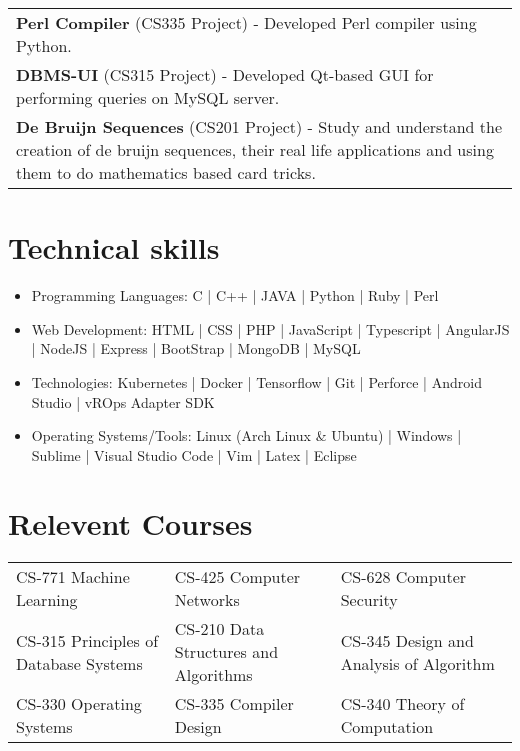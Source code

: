 \documentclass{article}
\begin{document}
\begin{tabularx}{\textwidth}{X}
	  \textbf{Perl Compiler} (CS335 Project) - Developed Perl compiler using Python.\\
	  \textbf{DBMS-UI} (CS315 Project) - Developed Qt-based GUI for performing queries on MySQL server.\\
	  \textbf{De Bruijn Sequences} (CS201 Project) - Study and understand the creation of de bruijn sequences, their real life
applications and using them to do mathematics based card tricks.
\end{tabularx}
\vspace{-4mm}

\section{Technical skills}
\begin{itemize}
	\setlength\itemsep{-0.5em}
	\item  Programming Languages: C | C++ | JAVA | Python | Ruby | Perl
	\item  Web Development: HTML | CSS | PHP | JavaScript | Typescript | AngularJS | NodeJS | Express | BootStrap | MongoDB | MySQL
	\item  Technologies: Kubernetes | Docker | Tensorflow | Git | Perforce | Android Studio | vROps Adapter SDK
	\item  Operating Systems/Tools: Linux (Arch Linux \& Ubuntu) | Windows | Sublime | Visual Studio Code | Vim | Latex | Eclipse
\end{itemize}
\vspace{-2mm}

\section{Relevent Courses}
\centering{}
\begin{tabular}{l|l|l}
CS-771 Machine Learning & CS-425 Computer Networks & CS-628 Computer Security \\
CS-315 Principles of Database Systems  & CS-210 Data Structures and Algorithms & CS-345 Design and Analysis of Algorithm\\
CS-330 Operating Systems & CS-335 Compiler Design & CS-340 Theory of Computation\\
\end{tabular}
\end{document}
